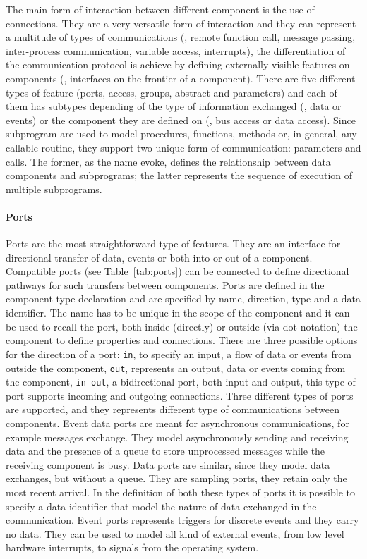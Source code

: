 The main form of interaction between different component is the use of connections. They are a very versatile form of interaction and they can represent a multitude of types of communications (\eg, remote function call, message passing, inter-process communication, variable access, interrupts), the differentiation of the communication protocol is achieve by defining externally visible features on components (\ie, interfaces on the frontier of a component). There are five different types of feature (ports, access, groups, abstract and parameters) and each of them has subtypes depending of the type of  information exchanged (\eg, data or events) or the component they are defined on (\eg, bus access or data access). Since subprogram are used to model procedures, functions, methods or, in general, any callable routine, they support two unique form of communication: parameters and calls. The former, as the name evoke, defines the relationship between data components and subprograms; the latter represents the sequence of execution of multiple subprograms.

\paragraph{Ports}
Ports are the most straightforward type of features. They are an interface for directional transfer of data, events or both into or out of a component. Compatible ports (see Table~\ref{tab:ports}) can be connected to define directional pathways for such transfers between components. Ports are defined in the component type declaration and are specified by name, direction, type and a data identifier. The name has to be unique in the scope of the component and it can be used to recall the port, both inside (directly) or outside (via dot notation) the component to define properties and connections. There are three possible options for the direction of a port: \texttt{in}, to specify an input, a flow of data or events from outside the component, \texttt{out}, represents an output, data or events coming from the component, \texttt{in out}, a bidirectional port, both input and output, this type of port supports incoming and outgoing connections. Three different types of ports are supported, and they represents different type of communications between components. Event data ports are meant for asynchronous communications, for example messages exchange. They model asynchronously sending and receiving data and the presence of a queue to store unprocessed messages while the receiving component is busy. Data ports are similar, since they model data exchanges, but without a queue. They are sampling ports, they retain only the most recent arrival. In the definition of both these types of ports it is possible to specify a data identifier that model the nature of data exchanged in the communication. Event ports represents triggers for discrete events and they carry no data. They can be used to model all kind of external events, from low level hardware interrupts, to signals from the operating system.

